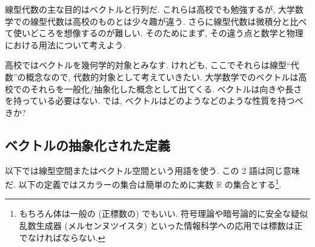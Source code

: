 \documentclass[openany, a4paper, oneside]{jsbook}
\theoremstyle{break}
\theoremstyle{breakdefn}
\newcommand{\bbR}{\mathbb{R}}
\begin{document}
線型代数の主な目的はベクトルと行列だ.
これらは高校でも勉強するが,
大学数学での線型代数は高校のものとは少々趣が違う.
さらに線型代数は微積分と比べて使いどころを想像するのが難しい.
そのためにまず, その違う点と数学と物理における用法について考えよう.

高校ではベクトルを幾何学的対象とみなす.
けれども, ここでそれらは線型``代数''の概念なので,
代数的対象として考えていきたい.
大学数学でのベクトルは高校でのそれらを一般化/抽象化した概念として出てくる.
ベクトルは向きや長さを持っている必要はない.
では, ベクトルはどのようなどのような性質を持つべきか?
\subsection{ベクトルの抽象化された定義}


以下では線型空間またはベクトル空間という用語を使う.
この 2 語は同じ意味だ.
以下の定義ではスカラーの集合は簡単のために実数 $\bbR$ の集合とする\footnote{もちろん体は一般の (正標数の) でもいい.
符号理論や暗号論的に安全な疑似乱数生成器 (メルセンヌツイスタ) といった情報科学への応用では標数は正でなければならない.
 }.
\end{document}
